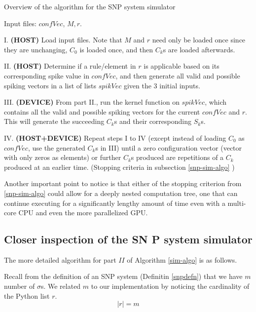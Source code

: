 \documentclass{svmultm}
\begin{document}
\begin{algorithm}                   
\caption{Overview of the algorithm for the SNP system simulator}         \label{sim-algo}                           
\begin{algorithmic}                    
\REQUIRE Input files: $confVec$, $M,r$.

I. \textbf{(HOST)} Load input files.
Note that $M$ and $r$ need only be loaded once since they are unchanging, $C_0$ is loaded once, and then $C_k$s are loaded afterwards.


II. \textbf{(HOST)} Determine if a rule/element in $r$ 
is applicable based on its corresponding spike value 
in $confVec$, and then generate all valid and
possible spiking vectors in a list of lists $spikVec$ given the 3 initial inputs.


III. \textbf{(DEVICE)} From part II., run the kernel 
function on $spikVec$, which contains all 
the valid and possible spiking vectors for 
the current $confVec$ and $r$. This will 
generate the succeeding $C_k$s and their corresponding $S_k$s.


IV. \textbf{(HOST+DEVICE)} Repeat steps I to IV (except instead of loading $C_0$ as $confVec$, use the generated $C_k$s in III) until
a zero configuration vector (vector with 
only zeros as elements) or further $C_k$s
produced are repetitions of a $C_k$
produced at an earlier time. (Stopping criteria in subsection \ref{snp-sim-algo} )

\end{algorithmic}
\end{algorithm}	

Another
important point to notice is that either of the stopping
criterion from \ref{snp-sim-algo} could allow for a deeply nested computation tree,
one that can continue executing for a significantly lengthy amount of
time even with a multi-core CPU and even the more parallelized
 {GPU}.


\subsection{Closer inspection of the SN P system
simulator}\label{siminspect}
	
The more detailed algorithm for part $II$ of Algorithm \ref{sim-algo} is as follows.

Recall from the definition of an SNP system (Definitin \ref{snpdefn}) that we have $m$ number of $\sigma$s. We related $m$ to our implementation by noticing the cardinality of the Python list $r$.
\begin{equation}\label{rcard}
|r| = m
\end{equation}
\end{document}
